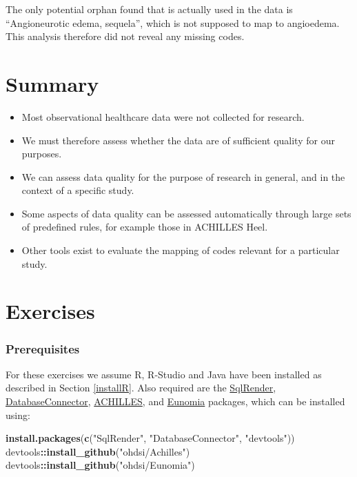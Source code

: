 \documentclass[11pt]{book}
\newenvironment{Shaded}{\begin{snugshade}}{\end{snugshade}}
\newcommand{\KeywordTok}[1]{\textcolor[rgb]{0.13,0.29,0.53}{\textbf{#1}}}
\newcommand{\NormalTok}[1]{#1}
\newcommand{\OperatorTok}[1]{\textcolor[rgb]{0.81,0.36,0.00}{\textbf{#1}}}
\newcommand{\StringTok}[1]{\textcolor[rgb]{0.31,0.60,0.02}{#1}}
\theoremstyle{definition}
\theoremstyle{definition}
\theoremstyle{definition}
\theoremstyle{remark}
\let\BeginKnitrBlock\begin \let\EndKnitrBlock\end
\begin{document}
The only potential orphan found that is actually used in the data is ``Angioneurotic edema, sequela'', which is not supposed to map to angioedema. This analysis therefore did not reveal any missing codes.

\hypertarget{summary-11}{%
\section{Summary}\label{summary-11}}

\BeginKnitrBlock{rmdsummary}
\begin{itemize}
\item
  Most observational healthcare data were not collected for research.
\item
  We must therefore assess whether the data are of sufficient quality for our purposes.
\item
  We can assess data quality for the purpose of research in general, and in the context of a specific study.
\item
  Some aspects of data quality can be assessed automatically through large sets of predefined rules, for example those in ACHILLES Heel.
\item
  Other tools exist to evaluate the mapping of codes relevant for a particular study.
\end{itemize}
\EndKnitrBlock{rmdsummary}

\hypertarget{exercises-6}{%
\section{Exercises}\label{exercises-6}}

\hypertarget{prerequisites-5}{%
\subsubsection*{Prerequisites}\label{prerequisites-5}}

For these exercises we assume R, R-Studio and Java have been installed as described in Section \ref{installR}. Also required are the \href{https://ohdsi.github.io/SqlRender/}{SqlRender}, \href{https://ohdsi.github.io/DatabaseConnector/}{DatabaseConnector}, \href{https://github.com/OHDSI/Achilles}{ACHILLES}, and \href{https://ohdsi.github.io/Eunomia/}{Eunomia} packages, which can be installed using:

\begin{Shaded}
\begin{Highlighting}[]
\KeywordTok{install.packages}\NormalTok{(}\KeywordTok{c}\NormalTok{(}\StringTok{"SqlRender"}\NormalTok{, }\StringTok{"DatabaseConnector"}\NormalTok{, }\StringTok{"devtools"}\NormalTok{))}
\NormalTok{devtools}\OperatorTok{::}\KeywordTok{install_github}\NormalTok{(}\StringTok{"ohdsi/Achilles"}\NormalTok{)}
\NormalTok{devtools}\OperatorTok{::}\KeywordTok{install_github}\NormalTok{(}\StringTok{"ohdsi/Eunomia"}\NormalTok{)}
\end{Highlighting}
\end{Shaded}
\end{document}
